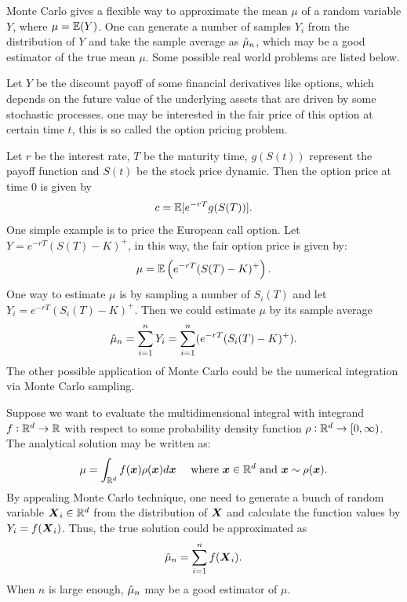 \documentclass{iitthesis}
\begin{document}
Monte Carlo gives a flexible way to approximate the mean $\mu$ of a random variable $Y$, where $\mu=\mathbb{E}(Y)$. One can generate a number of samples $Y_i$ from the distribution of $Y$ and take the sample average as $\hat{\mu}_n$, which may be a good estimator of the true mean $\mu$. Some possible real world problems are listed below. 

Let $Y$ be the discount payoff of some financial derivatives like options, which depends on the future value of the underlying assets that are driven by some stochastic processes. one may be interested in the fair price of this option at certain time $t$, this is so called the option pricing problem. 

Let $r$ be the interest rate, $T$ be the maturity time, $g(S(t))$ represent the payoff function and $S(t)$ be the stock price dynamic. Then the option price at time $0$ is given by $$c=\mathbb{E}[e^{-rT}g(S(T))].$$ One simple example is to price the European call option. Let $Y = e^{-rT}(S(T)-K)^+ $, in this way, the fair option price is given by:
$$\mu = \mathbb{E}\left(e^{-rT}(S(T)-K)^+\right).$$
One way to estimate $\mu$ is by sampling a number of $S_i(T)$ and let $Y_i = e^{-rT}(S_i(T)-K)^+$. Then we could estimate $\mu$ by its sample average
$$\hat{\mu}_n = \sum_{i=1}^n Y_i = \sum_{i=1}^n( e^{-rT}(S_i(T)-K)^+).$$
The other possible application of Monte Carlo could be the numerical integration via Monte Carlo sampling.

Suppose we want to evaluate the multidimensional integral with integrand $f:\mathbb{R}^d \to \mathbb{R}$ with respect to some probability density function $\rho: \mathbb{R}^d \to [0,\infty)$.
The analytical solution may be written as:
$$\mu = \int_{\mathbb{R}^d}f(\boldsymbol{x})\rho(\boldsymbol{x})d\boldsymbol{x} \quad \text{   where } \boldsymbol{x} \in \mathbb{R}^d \text{ and } \boldsymbol{x} \sim \rho(\boldsymbol{x}).$$
By appealing Monte Carlo technique, one need to generate a bunch of random variable $\boldsymbol{X}_i \in \mathbb{R}^d$ from the distribution of $\boldsymbol{X}$ and calculate the function values by $Y_i = f(\boldsymbol{X}_i)$. Thus, the true solution could be approximated as $$\hat{\mu}_n = \sum_{i=1}^n f(\boldsymbol{X}_i).$$
When $n$ is large enough, $\hat{\mu}_n$ may be a good estimator of $\mu$.
\end{document}
